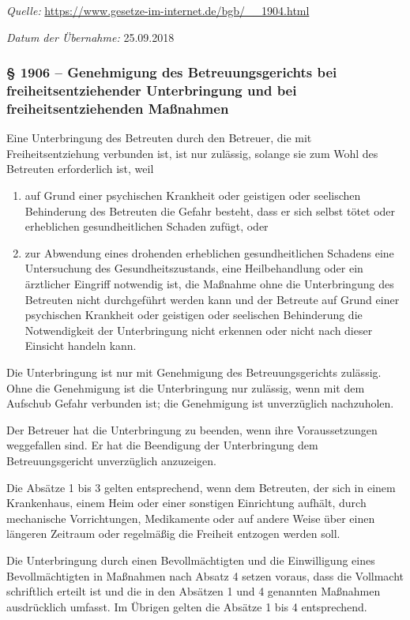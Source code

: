\textit{Quelle:} \url{https://www.gesetze-im-internet.de/bgb/__1904.html}

\textit{Datum der Übernahme:} 25.09.2018




\subsubsection*{§ 1906 -- Genehmigung des Betreuungsgerichts bei freiheitsentziehender Unterbringung und bei freiheitsentziehenden Maßnahmen}

\begin{legal}

\item  Eine Unterbringung des Betreuten durch den Betreuer, die mit Freiheitsentziehung verbunden ist, ist nur zulässig, solange sie zum Wohl des Betreuten erforderlich ist, weil

\begin{enumerate}
\item auf Grund einer psychischen Krankheit oder geistigen oder seelischen Behinderung des Betreuten die Gefahr besteht, dass er sich selbst tötet oder erheblichen gesundheitlichen Schaden zufügt, oder

\item zur Abwendung eines drohenden erheblichen gesundheitlichen Schadens eine Untersuchung des Gesundheitszustands, eine Heilbehandlung oder ein ärztlicher Eingriff notwendig ist, die Maßnahme ohne die Unterbringung des Betreuten nicht durchgeführt werden kann und der Betreute auf Grund einer psychischen Krankheit oder geistigen oder seelischen Behinderung die Notwendigkeit der Unterbringung nicht erkennen oder nicht nach dieser Einsicht handeln kann.

\end{enumerate}

\item Die Unterbringung ist nur mit Genehmigung des Betreuungsgerichts zulässig. Ohne die Genehmigung ist die Unterbringung nur zulässig, wenn mit dem Aufschub Gefahr verbunden ist; die Genehmigung ist unverzüglich nachzuholen.

\item Der Betreuer hat die Unterbringung zu beenden, wenn ihre Voraussetzungen weggefallen sind. Er hat die Beendigung der Unterbringung dem Betreuungsgericht unverzüglich anzuzeigen.

\item Die Absätze 1 bis 3 gelten entsprechend, wenn dem Betreuten, der sich in einem Krankenhaus, einem Heim oder einer sonstigen Einrichtung aufhält, durch mechanische Vorrichtungen, Medikamente oder auf andere Weise über einen längeren Zeitraum oder regelmäßig die Freiheit entzogen werden soll.

\item Die Unterbringung durch einen Bevollmächtigten und die Einwilligung eines Bevollmächtigten in Maßnahmen nach Absatz 4 setzen voraus, dass die Vollmacht schriftlich erteilt ist und die in den Absätzen 1 und 4 genannten Maßnahmen ausdrücklich umfasst. Im Übrigen gelten die Absätze 1 bis 4 entsprechend.

\end{legal}

